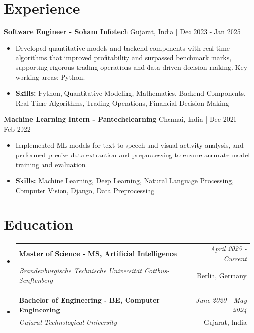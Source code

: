 \documentclass[a4paper,11pt]{article}
\makeatletter
\newcommand{\resumeSubheading}[4]{
\vspace{0.5mm}\item
    \begin{tabular*}{0.98\textwidth}[t]{l@{\extracolsep{\fill}}r}
        \textbf{#1} & \textit{\footnotesize{#4}} \\
        \textit{\footnotesize{#3}} &  \footnotesize{#2}\\
    \end{tabular*}
    \vspace{-2.4mm}
}
\makeatother
\begin{document}
\section{\textbf{Experience}}


\vspace{1mm}
  \textbf{Software Engineer - Soham Infotech} \hfill Gujarat, India | Dec 2023 - Jan 2025
\vspace{-1.5mm} %
\begin{itemize}
  \item Developed quantitative models and backend components with real-time algorithms that improved profitability and surpassed benchmark marks, supporting rigorous trading operations and data-driven decision making. Key working areas: Python.

\vspace{-2mm}
  \item \textbf{Skills:} Python, Quantitative Modeling, Mathematics, Backend Components, Real-Time Algorithms, Trading Operations, Financial Decision-Making
\end{itemize}

\vspace{1mm}
  \textbf{Machine Learning Intern - Pantechelearning} \hfill Chennai, India | Dec 2021 - Feb 2022
\vspace{-1.5mm} %
\begin{itemize}
  \item Implemented ML models for text-to-speech and visual activity analysis, and performed precise data extraction and preprocessing to ensure accurate model training and evaluation.
\vspace{-2mm}
  \item \textbf{Skills:} Machine Learning, Deep Learning, Natural Language Processing, Computer Vision, Django, Data Preprocessing
\end{itemize}\section{\textbf{Education}}
\vspace{-0.4mm}

\begin{itemize}
\resumeSubheading
{Master of Science - MS, Artificial Intelligence }{Berlin, Germany}
{Brandenburgische Technische Universität Cottbus-Senftenberg  }{April 2025 - Current}

\vspace{1.0mm} %
\resumeSubheading
{Bachelor of Engineering - BE, Computer Engineering  }{Gujarat, India}
{Gujarat Technological University }{June 2020 - May 2024}

\end{itemize}
\end{document}
